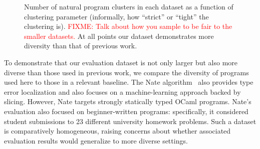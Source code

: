 \documentclass[conference]{IEEEtran}
\newcommand{\fixme}[1]{\textcolor{red}{FIXME: #1}}
\begin{document}

\begin{figure}
\caption{Number of natural program clusters in each dataset as a function
of clustering parameter (informally, how ``strict'' or ``tight'' the
clustering is). \fixme{Talk about how you sample to be fair to the smaller
datasets.} At all points our dataset demonstrates more diversity than
that of previous work.}
\label{fig-diversity}
\end{figure}

To demonstrate that our evaluation dataset is not only larger but also more
diverse than those used in previous work, we compare the diversity of
programs used here to those in a relevant baseline. The Nate
algorithm~\cite{learning-to-blame} also provides type error localization
and also focuses on a machine-learning approach backed by slicing. However,
Nate targets strongly statically typed OCaml programs. Nate's evaluation
also focused on beginner-written programs: specifically, it considered
student submissions to 23 different university homework problems.  Such a
dataset is comparatively homogeneous, raising concerns about whether
associated evaluation results would generalize to more diverse settings.
\end{document}
